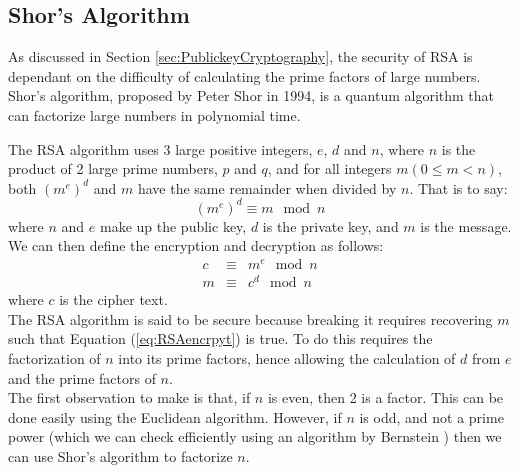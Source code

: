 \documentclass[reqno]{amsart}
\numberwithin{equation}{section}
\numberwithin{figure}{section}
\begin{document}
\subsection{Shor's Algorithm} \label{sec:ShorsAlgorithm}
\begin{justify}
    As discussed in Section \ref{sec:PublickeyCryptography}, the security of RSA is dependant on the difficulty of calculating the prime factors of large numbers. Shor's algorithm, proposed by Peter Shor in 1994, is a quantum algorithm that can factorize large numbers in polynomial time. \cite{Shor1994}

The RSA algorithm uses 3 large positive integers, $e$, $d$ and $n$, where $n$ is the product of 2 large prime numbers, $p$ and $q$, and for all integers $m(0 \leq m < n)$, both $(m^{e})^{d}$ and $m$ have the same remainder when divided by $n$. That is to say:
    \begin{equation}
        (m^{e})^{d} \equiv m \mod n
    \end{equation}
where $n$ and $e$ make up the public key, $d$ is the private key, and $m$ is the message. We can then define the encryption and decryption as follows: 
    \begin{eqnarray}
        c &\equiv& m^{e} \mod n \label{eq:RSAencrpyt} \\
        m &\equiv& c^{d} \mod n
    \end{eqnarray}
where $c$ is the cipher text. \\

The RSA algorithm is said to be secure because breaking it requires recovering $m$ such that Equation (\ref{eq:RSAencrpyt}) is true. To do this requires the factorization of $n$ into its prime factors, hence allowing the calculation of $d$ from $e$ and the prime factors of $n$. \\

The first observation to make is that, if $n$ is even, then 2 is a factor. This can be done easily using the Euclidean algorithm. \cite{Shallit1994} However, if $n$ is odd, and not a prime power (which we can check efficiently using an algorithm by Bernstein \cite{Bernstein1998}) then we can use Shor's algorithm to factorize $n$. \\


\end{justify}
\end{document}
